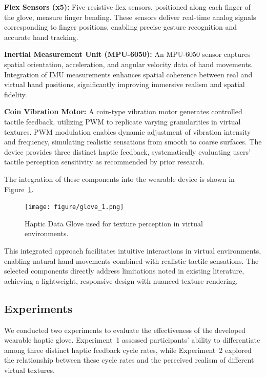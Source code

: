\documentclass[graybox]{svmult}
\begin{document}
\textbf{Flex Sensors (x5):}
Five resistive flex sensors, positioned along each finger of the glove, measure finger bending. These sensors deliver real-time analog signals corresponding to finger positions, enabling precise gesture recognition and accurate hand tracking.

\textbf{Inertial Measurement Unit (MPU-6050):}
An MPU-6050 sensor captures spatial orientation, acceleration, and angular velocity data of hand movements. Integration of IMU measurements enhances spatial coherence between real and virtual hand positions, significantly improving immersive realism and spatial fidelity.

\textbf{Coin Vibration Motor:}
A coin-type vibration motor generates controlled tactile feedback, utilizing PWM to replicate varying granularities in virtual textures. PWM modulation enables dynamic adjustment of vibration intensity and frequency, simulating realistic sensations from smooth to coarse surfaces. The device provides three distinct haptic feedback, systematically evaluating users' tactile perception sensitivity as recommended by prior research.

The integration of these components into the wearable device is shown in Figure~\ref{fig:glove_1}.

\begin{figure}\centering
	\texttt{[image: figure/glove\_1.png]}%
	\caption{Haptic Data Glove used for texture perception in virtual environments.}\label{fig:glove_1}
\end{figure}

This integrated approach facilitates intuitive interactions in virtual environments, enabling natural hand movements combined with realistic tactile sensations. The selected components directly address limitations noted in existing literature, achieving a lightweight, responsive design with nuanced texture rendering.

\subsection{Experiments}\label{sec:Experiments}
We conducted two experiments to evaluate the effectiveness of the developed wearable haptic glove. Experiment~1 assessed participants' ability to differentiate among three distinct haptic feedback cycle rates, while Experiment~2 explored the relationship between these cycle rates and the perceived realism of different virtual textures.
\end{document}
